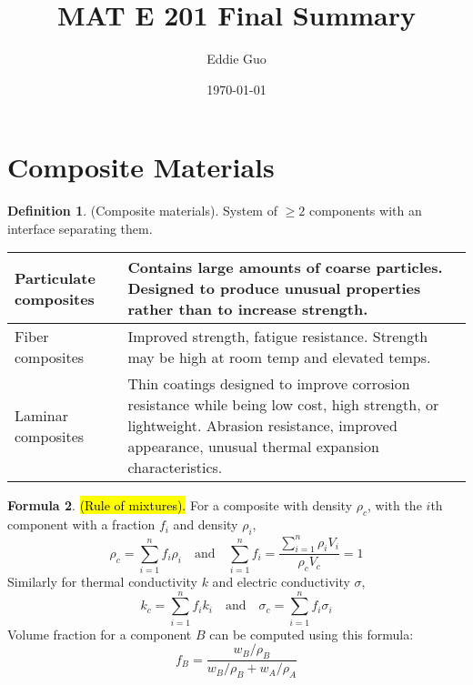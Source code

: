 \documentclass{article}
\title{\LARGE MAT E 201 Final Summary}
\author{Eddie Guo}
\date{\today}
\theoremstyle{definition}
\newtheorem{definition}{Definition}[section]
\newtheorem{formula}[definition]{Formula}
\begin{document}
\maketitle
\tableofcontents

\section{Composite Materials}

\begin{definition}
    (Composite materials). System of $\geq 2$ components with an interface separating them.
    \begin{table}[ht]
        \centering
        \begin{tabular}{p{4cm} p{11cm}}
            \toprule
            Particulate composites & Contains large amounts of coarse particles. Designed to produce unusual properties rather than to increase strength. \\
            \midrule
            Fiber composites & Improved strength, fatigue resistance. Strength may be high at room temp and elevated temps. \\
            \midrule
            Laminar composites & Thin coatings designed to improve corrosion resistance while being low cost, high strength, or lightweight. Abrasion resistance, improved appearance, unusual thermal expansion characteristics. \\
            \bottomrule
        \end{tabular}
    \end{table}
\end{definition}

\begin{formula}
    \hl{(Rule of mixtures).} For a composite with density $\rho_c$, with the $i$th component with a fraction $f_i$ and density $\rho_i$,
    \begin{equation}
        \rho_c = \sum_{i=1}^n f_i \rho_i \quad \text{and} \quad \sum_{i=1}^n f_i = \frac{\sum_{i=1}^n \rho_i V_i}{\rho_c V_c} = 1
    \end{equation}
    Similarly for thermal conductivity $k$ and electric conductivity $\sigma$,
    \begin{equation}
        k_c = \sum_{i=1}^n f_i k_i \quad \text{and} \quad \sigma_c =\sum_{i=1}^n f_i \sigma_i
    \end{equation}
    Volume fraction for a component $B$ can be computed using this formula:
    \begin{equation}
        f_B = \frac{w_B/\rho_B}{w_B/\rho_B + w_A/\rho_A}
    \end{equation}
\end{formula}
\end{document}
